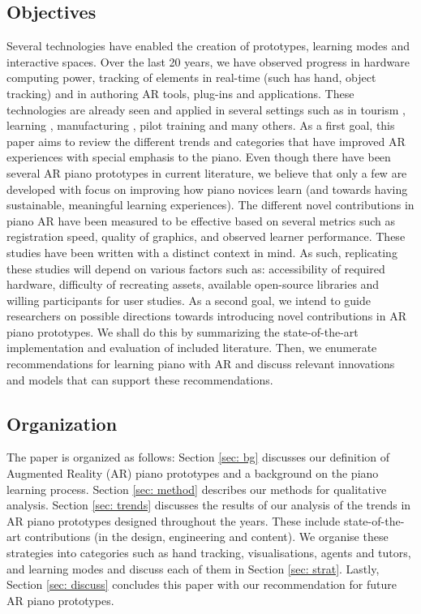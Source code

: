 \documentclass[manuscript,screen]{acmart}
\begin{document}
\subsection{Objectives}
Several technologies have enabled the creation of prototypes, learning modes and interactive spaces. Over the last 20 years, we have observed progress in hardware computing power, tracking of elements in real-time (such has hand, object tracking) and in authoring AR tools, plug-ins and applications. These technologies are already seen and applied in several settings such as in tourism \cite{kounavis2012enhancing}, learning \cite{santos2013augmented}, manufacturing \cite{thomas1992augmented}, pilot training \cite{macchiarella2004augmented} and many others. As a first goal, this paper aims to review the different trends and categories that have improved AR experiences with special emphasis to the piano. Even though there have been several AR piano prototypes in current literature, we believe that only a few are developed with focus on improving how piano novices learn (and towards having sustainable, meaningful learning experiences). The different novel contributions in piano AR have been measured to be effective based on several metrics such as registration speed, quality of graphics, and observed learner performance. These studies have been written with a distinct context in mind. As such, replicating these studies will depend on various factors such as: accessibility of required hardware, difficulty of recreating assets, available open-source libraries and willing participants for user studies. As a second goal, we intend to guide researchers on possible directions towards introducing novel contributions in AR piano prototypes. We shall do this by summarizing the state-of-the-art implementation and evaluation of included literature. Then, we enumerate recommendations for learning piano with AR and discuss relevant innovations and models that can support these recommendations. 

\subsection{Organization}
The paper is organized as follows: Section \ref{sec: bg}  discusses our definition of Augmented Reality (AR) piano prototypes and a background on the piano learning process. Section \ref{sec: method} describes our methods for qualitative analysis. Section \ref{sec: trends} discusses the results of our analysis of the trends in AR piano prototypes designed throughout the years. These include state-of-the-art contributions (in the design, engineering and content). We organise these strategies into categories such as hand tracking, visualisations, agents and tutors, and learning modes and discuss each of them in Section \ref{sec: strat}. Lastly, Section \ref{sec: discuss} concludes this paper with our recommendation for future AR piano prototypes. 
\end{document}

